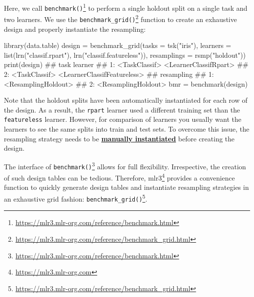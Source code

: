 \documentclass[12pt,]{scrbook}
\newenvironment{Shaded}{}{}
\newcommand{\DataTypeTok}[1]{#1}
\newcommand{\KeywordTok}[1]{\textcolor[rgb]{0.00,0.00,1.00}{#1}}
\newcommand{\NormalTok}[1]{#1}
\newcommand{\StringTok}[1]{\textcolor[rgb]{0.00,0.50,0.50}{#1}}
\renewcommand{\href}[2]{#2\footnote{\url{#1}}}
\begin{document}
Here, we call \href{https://mlr3.mlr-org.com/reference/benchmark.html}{\texttt{benchmark()}} to perform a single holdout split on a single task and two learners.
We use the \href{https://mlr3.mlr-org.com/reference/benchmark_grid.html}{\texttt{benchmark\_grid()}} function to create an exhaustive design and properly instantiate the resampling:

\begin{Shaded}
\begin{Highlighting}[]
\KeywordTok{library}\NormalTok{(data.table)}
\NormalTok{design =}\StringTok{ }\KeywordTok{benchmark_grid}\NormalTok{(}\DataTypeTok{tasks =} \KeywordTok{tsk}\NormalTok{(}\StringTok{"iris"}\NormalTok{), }\DataTypeTok{learners =} \KeywordTok{list}\NormalTok{(}\KeywordTok{lrn}\NormalTok{(}\StringTok{"classif.rpart"}\NormalTok{), }
  \KeywordTok{lrn}\NormalTok{(}\StringTok{"classif.featureless"}\NormalTok{)), }\DataTypeTok{resamplings =} \KeywordTok{rsmp}\NormalTok{(}\StringTok{"holdout"}\NormalTok{))}
\KeywordTok{print}\NormalTok{(design)}
\NormalTok{##             task                     learner}
\NormalTok{## 1: <TaskClassif>       <LearnerClassifRpart>}
\NormalTok{## 2: <TaskClassif> <LearnerClassifFeatureless>}
\NormalTok{##             resampling}
\NormalTok{## 1: <ResamplingHoldout>}
\NormalTok{## 2: <ResamplingHoldout>}
\NormalTok{bmr =}\StringTok{ }\KeywordTok{benchmark}\NormalTok{(design)}
\end{Highlighting}
\end{Shaded}

Note that the holdout splits have been automatically instantiated for each row of the design.
As a result, the \texttt{rpart} learner used a different training set than the \texttt{featureless} learner.
However, for comparison of learners you usually want the learners to see the same splits into train and test sets.
To overcome this issue, the resampling strategy needs to be \protect\hyperlink{resampling-inst}{\textbf{manually instantiated}} before creating the design.

The interface of \href{https://mlr3.mlr-org.com/reference/benchmark.html}{\texttt{benchmark()}} allows for full flexibility.
Irrespective, the creation of such design tables can be tedious.
Therefore, \href{https://mlr3.mlr-org.com}{mlr3} provides a convenience function to quickly generate design tables and instantiate resampling strategies in an exhaustive grid fashion: \href{https://mlr3.mlr-org.com/reference/benchmark_grid.html}{\texttt{benchmark\_grid()}}.
\end{document}
